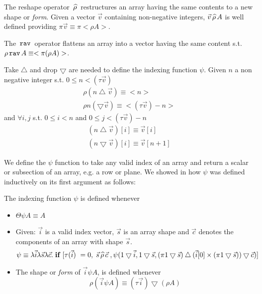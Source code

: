 \begin{definition}
The reshape operator $\,\widehat{\rho}\,$ restructures an array
having the same contents to a new shape or {\em form}.
Given a vector $\vec v$ containing non-negative integers,
$\vec v \,\widehat{\rho}\, A $ is well defined providing
$\pi \vec v \equiv \pi <\rho A >$.
\end{definition}
\begin{definition}
The $\,\mbox{\tt rav}\,$ operator flattens an array into a vector having the
same content s.t. $\rho \,\mbox{\tt rav}\, A \equiv <\pi (\rho A)>$.
\end{definition}
\begin{definition} Take $\bigtriangleup$ and drop $\bigtriangledown$ are
needed to define the indexing function $\psi$. Given $n$ a non negative
integer s.t. $ 0 \leq n < ( \tau \vec v )$
\begin{eqnarray*}
\rho (n \bigtriangleup \vec v )\equiv <n> \\ \rho n (\bigtriangledown \vec v )
\equiv < ( \tau \vec v ) - n >
\end{eqnarray*}
and $\forall i,j$ s.t. $ 0 \leq i < n$ and $0 \leq j < (\tau \vec v)-n$
\begin{eqnarray*}
( n \bigtriangleup \vec v ) [i] \equiv \vec v [i] \\
( n \bigtriangledown \vec v) [i] \equiv \vec v [n+1]
\end{eqnarray*}
\end{definition}
We define the $\psi$ function to
take any valid index of an array and return a scalar or subsection
of an array, e.g. a row or plane.
We showed in \cite{hai91} how $\psi$ was defined inductively on its
first argument as follows:
\begin{definition}
The indexing function $\psi$ is defined whenever
\begin{itemize}
\item $\Theta \psi A \equiv A$
\item Given: $\vec i$ is a valid index vector,
$\vec s $ is  an array shape and
$\vec c$  denotes the components of an array with shape $\vec s$.
\[\psi \equiv \lambda \vec i \lambda \vec s \lambda \vec c.\; {\bf if}\;[\tau (\vec i)\ = 0, \;\vec s \,\widehat{\rho}\, \vec c\;, \psi ( 1 \bigtriangledown 
\vec i,
1 \bigtriangledown \vec s, ( \pi 1 \bigtriangledown \vec s )
\bigtriangleup ( \vec i [0] \times ( \pi 1 \bigtriangledown \vec s ))
\bigtriangledown \vec c )] \]
\item The shape or {\em form} of $\vec i \psi A$, is defined
whenever
\[ \rho (\vec i \psi A) \equiv (\tau \vec i ) \bigtriangledown (\rho A ) \]
\end{itemize}
\end{definition}
